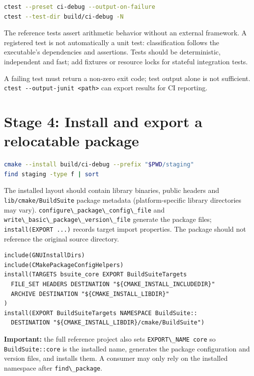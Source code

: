 \documentclass[11pt,letterpaper,oneside]{report}
\providecommand{\passthrough}[1]{#1}
\begin{document}
\begin{lstlisting}[language=sh]
ctest --preset ci-debug --output-on-failure
ctest --test-dir build/ci-debug -N
\end{lstlisting}

The reference tests assert arithmetic behavior without an external
framework. A registered test is not automatically a unit test:
classification follows the executable's dependencies and assertions.
Tests should be deterministic, independent and fast; add fixtures or
resource locks for stateful integration tests.

A failing test must return a non-zero exit code; test output alone is
not sufficient. \passthrough{\lstinline!ctest --output-junit <path>!}
can export results for CI reporting.

\chapter{Stage 4: Install and export a relocatable
package}\label{stage-4-install-and-export-a-relocatable-package}

\begin{lstlisting}[language=sh]
cmake --install build/ci-debug --prefix "$PWD/staging"
find staging -type f | sort
\end{lstlisting}

The installed layout should contain library binaries, public headers and
\passthrough{\lstinline!lib/cmake/BuildSuite!} package metadata
(platform-specific library directories may vary).
\passthrough{\lstinline!configure\_package\_config\_file!} and
\passthrough{\lstinline!write\_basic\_package\_version\_file!} generate
the package files; \passthrough{\lstinline!install(EXPORT ...)!} records
target import properties. The package should not reference the original
source directory.

\begin{lstlisting}
include(GNUInstallDirs)
include(CMakePackageConfigHelpers)
install(TARGETS bsuite_core EXPORT BuildSuiteTargets
  FILE_SET HEADERS DESTINATION "${CMAKE_INSTALL_INCLUDEDIR}"
  ARCHIVE DESTINATION "${CMAKE_INSTALL_LIBDIR}"
)
install(EXPORT BuildSuiteTargets NAMESPACE BuildSuite::
  DESTINATION "${CMAKE_INSTALL_LIBDIR}/cmake/BuildSuite")
\end{lstlisting}

\textbf{Important:} the full reference project also sets
\passthrough{\lstinline!EXPORT\_NAME core!} so
\passthrough{\lstinline!BuildSuite::core!} is the installed name,
generates the package configuration and version files, and installs
them. A consumer may only rely on the installed namespace after
\passthrough{\lstinline!find\_package!}.
\end{document}
